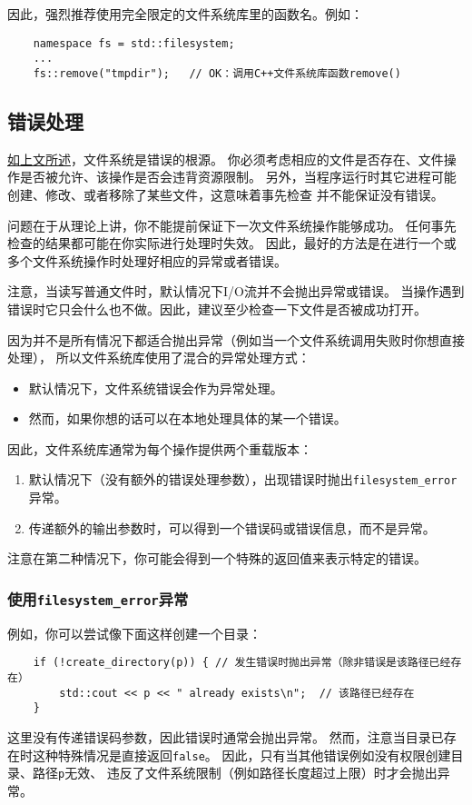 因此，强烈推荐使用完全限定的文件系统库里的函数名。例如：
\begin{lstlisting}
    namespace fs = std::filesystem;
    ...
    fs::remove("tmpdir");   // OK：调用C++文件系统库函数remove()
\end{lstlisting}

\subsection{错误处理}
\hyperref[ch20.1.3.6]{如上文所述}，文件系统是错误的根源。
你必须考虑相应的文件是否存在、文件操作是否被允许、该操作是否会违背资源限制。
另外，当程序运行时其它进程可能创建、修改、或者移除了某些文件，这意味着事先检查
并不能保证没有错误。

问题在于从理论上讲，你不能提前保证下一次文件系统操作能够成功。
任何事先检查的结果都可能在你实际进行处理时失效。
因此，最好的方法是在进行一个或多个文件系统操作时处理好相应的异常或者错误。

注意，当读写普通文件时，默认情况下I/O流并不会抛出异常或错误。
当操作遇到错误时它只会什么也不做。因此，建议至少检查一下文件是否被成功打开。

因为并不是所有情况下都适合抛出异常（例如当一个文件系统调用失败时你想直接处理），
所以文件系统库使用了混合的异常处理方式：
\begin{itemize}
    \item 默认情况下，文件系统错误会作为异常处理。
    \item 然而，如果你想的话可以在本地处理具体的某一个错误。
\end{itemize}
因此，文件系统库通常为每个操作提供两个重载版本：
\begin{enumerate}
    \item 默认情况下（没有额外的错误处理参数），出现错误时抛出\texttt{filesystem\_error}异常。
    \item 传递额外的输出参数时，可以得到一个错误码或错误信息，而不是异常。
\end{enumerate}
注意在第二种情况下，你可能会得到一个特殊的返回值来表示特定的错误。

\subsubsection{使用\texttt{filesystem\_error}异常}\label{ch20.2.6.1}
例如，你可以尝试像下面这样创建一个目录：
\begin{lstlisting}
    if (!create_directory(p)) { // 发生错误时抛出异常（除非错误是该路径已经存在）
        std::cout << p << " already exists\n";  // 该路径已经存在
    }
\end{lstlisting}
这里没有传递错误码参数，因此错误时通常会抛出异常。
然而，注意当目录已存在时这种特殊情况是直接返回\texttt{false}。
因此，只有当其他错误例如没有权限创建目录、路径\texttt{p}无效、
违反了文件系统限制（例如路径长度超过上限）时才会抛出异常。

